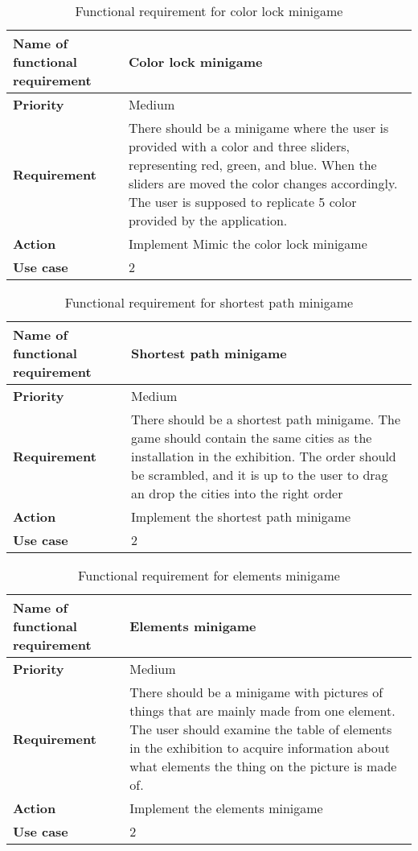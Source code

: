\begin{table}[!h]
\caption{Functional requirement for color lock minigame}
\begin{tabular}{ |p{7cm}|p{7cm}| }
\hline
\textbf {Name of functional requirement} & {Color lock minigame} \\ \hline
\textbf {Priority} & {Medium} \\ \hline
\textbf {Requirement} & {There should be a minigame where the user is provided with a color and three sliders, representing red, green, and blue. When the sliders are moved the color changes accordingly. The user is supposed to replicate 5 color provided by the application.} \\ \hline
\textbf {Action} & {Implement Mimic the color lock minigame} \\ \hline
\textbf {Use case} & {2} \\ \hline
\end{tabular}
\end{table}

\begin{table}[!h]
\caption{Functional requirement for shortest path minigame}
\begin{tabular}{ |p{7cm}|p{7cm}| }
\hline
\textbf {Name of functional requirement} & {Shortest path minigame} \\ \hline
\textbf {Priority} & {Medium} \\ \hline
\textbf {Requirement} & {There should be a shortest path minigame. The game should contain the same cities as the installation in the exhibition. The order should be scrambled, and it is up to the user to drag an drop the cities into the right order} \\ \hline
\textbf {Action} & {Implement the shortest path minigame} \\ \hline
\textbf {Use case} & {2} \\ \hline
\end{tabular}
\end{table}

\begin{table}[!h]
\caption{Functional requirement for elements minigame}
\begin{tabular}{ |p{7cm}|p{7cm}| }
\hline
\textbf {Name of functional requirement} & {Elements minigame} \\ \hline
\textbf {Priority} & {Medium} \\ \hline
\textbf {Requirement} & {There should be a minigame with pictures of things that are mainly made from one element. The user should examine the table of elements in the exhibition to acquire information about what elements the thing on the picture is made of.} \\ \hline
\textbf {Action} & {Implement the elements minigame} \\ \hline
\textbf {Use case} & {2} \\ \hline
\end{tabular}
\end{table}

